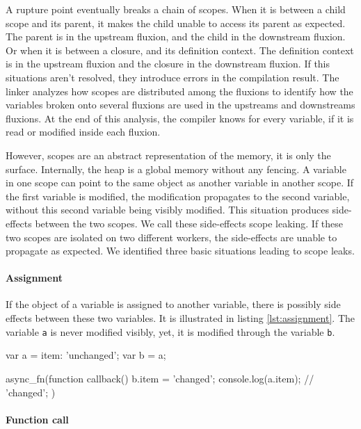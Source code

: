 A rupture point eventually breaks a chain of scopes.
When it is between a child scope and its parent, it makes the child unable to access its parent as expected.
The parent is in the upstream fluxion, and the child in the downstream fluxion.
Or when it is between a closure, and its definition context.
The definition context is in the upstream fluxion and the closure in the downstream fluxion.
If this situations aren't resolved, they introduce errors in the compilation result.
The linker analyzes how scopes are distributed among the fluxions to identify how the variables broken onto several fluxions are used in the upstreams and downstreams fluxions.
At the end of this analysis, the compiler knows for every variable, if it is read or modified inside each fluxion.

However, scopes are an abstract representation of the memory, it is only the surface.
Internally, the heap is a global memory without any fencing.
A variable in one scope can point to the same object as another variable in another scope.
If the first variable is modified, the modification propagates to the second variable, without this second variable being visibly modified.
This situation produces side-effects between the two scopes.
We call these side-effects scope leaking.
If these two scopes are isolated on two different workers, the side-effects are unable to propagate as expected.
We identified three basic situations leading to scope leaks.

\paragraph{Assignment}

If the object of a variable is assigned to another variable, there is possibly side effects between these two variables.
It is illustrated in listing \ref{lst:assignment}.
The variable \texttt{a} is never modified visibly, yet, it is modified through the variable \texttt{b}.

\begin{code}[js, caption={Example of a scope leak due to assignment},label={lst:assignment}]
var a = {item: 'unchanged'};
var b = a;

async_fn(function callback() {
  b.item = 'changed';
  console.log(a.item); // 'changed';
})
\end{code}

\paragraph{Function call}

